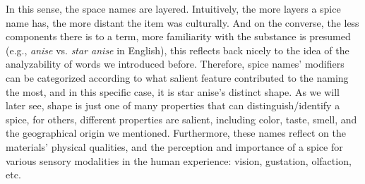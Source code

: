 In this sense, the space names are layered. Intuitively, the more layers a spice name has, the more distant the item was culturally. And on the converse, the less components there is to a term, more familiarity with the substance is presumed (e.g., \textit{anise} vs. \textit{star anise} in English), this reflects back nicely to the idea of the analyzability of words we introduced before. Therefore, spice names' modifiers can be categorized according to what salient feature contributed to the naming the most, and in this specific case, it is star anise's distinct shape. As we will later see, shape is just one of many properties that can distinguish/identify a spice, for others, different properties are salient, including color, taste, smell, and the geographical origin we mentioned. Furthermore, these names reflect on the materials' physical qualities, and the perception and importance of a spice for various sensory modalities in the human experience: vision, gustation, olfaction, etc. 










